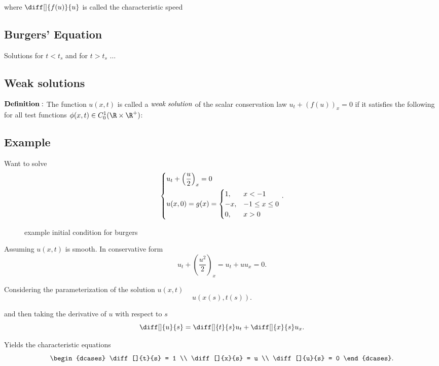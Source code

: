 where $\diff[]{f(u)}{u}$ is called the characteristic speed

\subsection{Burgers' Equation}%

Solutions for $t < t_{s}$ and for $t > t_{s}$ $\dots$

\subsection{Weak solutions}%

$\bf{Definition:}$ The function $u(x,t)$ is called a $\emph{weak solution}$ of
the scalar conservation law $u_{t}+(f(u))_{x} = 0$ if it satisfies the
following for all test functions $\phi(x,t)\in C_{0}^{1}(\R \times \R^{+})$:

\subsection{Example}%
Want to solve
\[
\begin{dcases}
  u_{t}+ \left( \frac{u}{2} \right)_{x} = 0 \\
  u(x,0) = g(x) = 
    \begin{cases}
      1, & x < -1 \\
      -x, & -1 \leq x \leq 0 \\
      0, & x > 0
    \end{cases}
\end{dcases}
.\] 

\begin{figure}[ht]
    \centering
    \caption{example initial condition for burgers}
    \label{fig:example-initial-condition-for-burgers}
\end{figure}

Assuming $u(x,t)$ is smooth. In conservative form
\[
  u_{t}+ \left( \frac{u^{2}}{2} \right)_{x} = u_{t}+uu_{x} = 0
.\] 

Considering the parameterization of the solution $u(x,t)$
 \[
   u(x(s),t(s))
.\] 

and then taking the derivative of $u$ with respect to $s$ 
\[
\diff[]{u}{s}=\diff[]{t}{s}u_{t}+\diff[]{x}{s}u_{x}
.\] 

Yields the characteristic equations
\[
\begin{dcases}
  \diff[]{t}{s} = 1 \\
  \diff[]{x}{s} = u \\
  \diff[]{u}{s} = 0
\end{dcases}
.\] 

